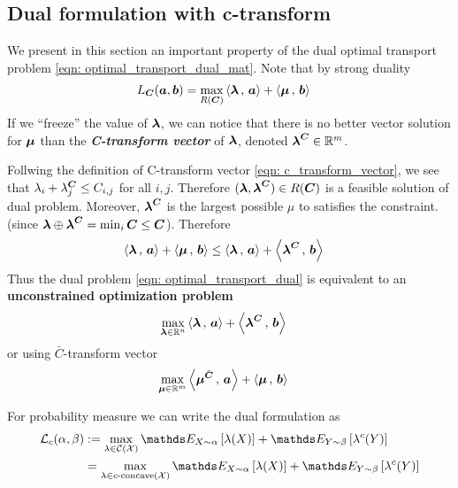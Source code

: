 \documentclass[11pt]{article}
\begin{document}
\subsection{Dual formulation with c-transform}
We present in this section an important property of the dual optimal transport problem \eqref{eqn: optimal_transport_dual_mat}. Note that by strong duality
\begin{align*}
L_{\boldsymbol{C}}(\boldsymbol{a}, \boldsymbol{b}) &= \max_{R(\boldsymbol{C})} \left\langle \boldsymbol{\lambda}\,,\, \boldsymbol{a} \right\rangle + \left\langle \boldsymbol{\mu}\,,\, \boldsymbol{b} \right\rangle
\end{align*} If we “freeze” the value of $\boldsymbol{\lambda}$, we can notice that there is no better vector solution for $\boldsymbol{\mu}$ than the \emph{\textbf{C-transform vector}} of $\boldsymbol{\lambda}$, denoted $\boldsymbol{\lambda}^{\boldsymbol{C}} \in {\mathbb R}^m$.

Follwing the definition of C-transform vector \eqref{eqn: c_transform_vector}, we see that $\lambda_{i} + \lambda_{j}^{\boldsymbol{C}} \le C_{i,j}$ for all $i,j$. Therefore $(\boldsymbol{\lambda}, \boldsymbol{\lambda}^{\boldsymbol{C}}) \in R(\boldsymbol{C})$ is a feasible solution of dual problem. Moreover, $\boldsymbol{\lambda}^{\boldsymbol{C}}$ is the largest possible $\mu$ to satisfies the constraint. (since $\boldsymbol{\lambda} \oplus \boldsymbol{\lambda}^{\boldsymbol{C}} = \min_{i}\boldsymbol{C} \le \boldsymbol{C}$). Therefore 
\begin{align*}
 \left\langle \boldsymbol{\lambda}\,,\, \boldsymbol{a} \right\rangle + \left\langle \boldsymbol{\mu}\,,\, \boldsymbol{b} \right\rangle &\le  \left\langle \boldsymbol{\lambda}\,,\, \boldsymbol{a} \right\rangle + \left\langle  \boldsymbol{\lambda}^{\boldsymbol{C}}\,,\, \boldsymbol{b} \right\rangle
\end{align*} Thus the dual problem \eqref{eqn: optimal_transport_dual} is equivalent to an \textbf{unconstrained optimization problem}
\begin{align}
\max_{\boldsymbol{\lambda} \in {\mathbb R}^{n}} & \left\langle \boldsymbol{\lambda}\,,\, \boldsymbol{a} \right\rangle + \left\langle \boldsymbol{\lambda}^{\boldsymbol{C}}\,,\, \boldsymbol{b} \right\rangle \label{eqn: optimal_transport_dual_c_transform}\end{align}
or using $\bar{C}$-transform vector
\begin{align}
\max_{\boldsymbol{\mu} \in {\mathbb R}^{m}} & \left\langle \boldsymbol{\mu}^{\bar{\boldsymbol{C}}}\,,\, \boldsymbol{a} \right\rangle + \left\langle \boldsymbol{\mu}\,,\, \boldsymbol{b} \right\rangle \label{eqn: optimal_transport_dual_c_bar_transform}\end{align}

For probability measure we can write the dual formulation as
\begin{align}
\cL_{c}(\alpha, \beta)&:= \max_{\lambda \in \cC(\cX)} \E{X \sim \alpha}{\lambda(X)} + \E{Y \sim \beta}{\lambda^{c}(Y)}   \label{eqn: optimal_transport_dual_c_transform_prob} \\
&= \max_{\lambda \in c\text{-concave}(\cX)} \E{X \sim \alpha}{\lambda(X)} + \E{Y \sim \beta}{\lambda^{c}(Y)}   \label{eqn: optimal_transport_dual_c_concave_prob}
\end{align}
\end{document}

